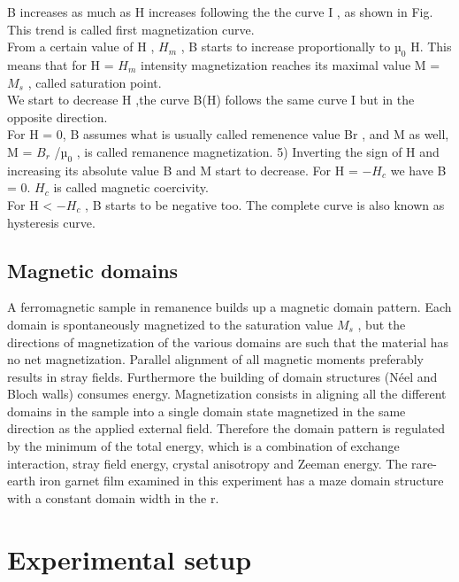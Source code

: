 \documentclass{article}
\begin{document}
B increases as much as H increases following the the curve I , as shown in Fig. This trend is called ﬁrst magnetization curve. \\
From a certain value of H , $H_m$ , B starts to increase proportionally to $µ_0$ H. This means that for H = $H_m$ intensity magnetization reaches its maximal 
value M = $M_s$ , called saturation point.\\
We start to decrease H ,the   curve   B(H) follows the same  curve  I but in  the  opposite  direction. \\
For H = 0, B assumes what is usually called remenence value Br , and M as well, M = $B_r$ /$µ_0$ , is called remanence magnetization.
5) Inverting the sign of H and increasing its absolute value B and M start to decrease. For H = $−H_c$ we have B = 0. $H_c$ is called magnetic coercivity. \\
For H  < $−H_c$ , B  starts to be negative too. The complete 
curve  is  also  known  as  hysteresis  curve. \\

\subsection{Magnetic domains}
A ferromagnetic sample in remanence builds up a magnetic domain pattern. Each domain is spontaneously magnetized to the saturation value $M_s$ , but 
the directions of magnetization of the various domains are such that the material has no net magnetization. Parallel alignment of all magnetic moments preferably results in stray fields. Furthermore the building of domain structures (Néel and Bloch walls) consumes energy. Magnetization consists in aligning all the different domains in the sample into a single domain state magnetized in the same direction as the applied external ﬁeld. Therefore the domain pattern is regulated by the minimum of the total energy, which is a combination of exchange interaction, stray field energy, crystal anisotropy and Zeeman energy. The rare-earth iron garnet film examined in this experiment has a maze domain structure with a constant domain width in the r.
\clearpage
\section{Experimental setup}
\end{document}
